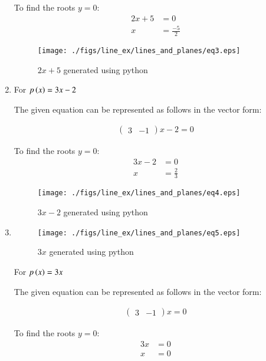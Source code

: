 \begin{enumerate}
To find the roots $y=0$:
\begin{align}
2x + 5 &= 0 \\
x &= \frac{-5}{2}
\end{align}
\begin{figure}[!ht]
\centering
\texttt{[image: ./figs/line\_ex/lines\_and\_planes/eq3.eps]}
\caption{$2x + 5$ generated using python}
\label{fig:eq3_lines_and_planes}
\end{figure} 
\item \solution For $p\left(x\right) = 3x - 2$
\begin{flushleft}
The given equation can be represented as follows in the vector form:
\end{flushleft}
\begin{align}
\begin{pmatrix}
3 & -1 
\end{pmatrix}
x - 2 = 0
\end{align}

To find the roots $y=0$:
\begin{align}
3x - 2 &= 0 \\
x &= \frac{2}{3}
\end{align}
\begin{figure}[!ht]
\centering
\texttt{[image: ./figs/line\_ex/lines\_and\_planes/eq4.eps]}
\caption{$3x - 2$ generated using python}
\label{fig:eq4_lines_and_planes}
\end{figure} 
\item 
\begin{figure}[!ht] 
\centering
\texttt{[image: ./figs/line\_ex/lines\_and\_planes/eq5.eps]}
\caption{$3x$ generated using python}
\label{fig:eq5_lines_and_planes}
\end{figure} 
\solution For $p\left(x\right) = 3x$
\begin{flushleft}
The given equation can be represented as follows in the vector form:
\end{flushleft}
\begin{align}
\begin{pmatrix}
3 & -1 
\end{pmatrix}
x  = 0
\end{align}

To find the roots $y=0$:
\begin{align}
3x  &= 0 \\
x &= 0
\end{align}

\end{enumerate}
\pagebreak